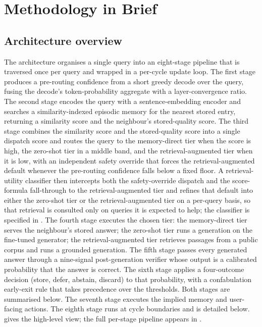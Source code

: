 \section{Methodology in Brief}
\label{sec:methodology-brief}

\subsection{Architecture overview}
\label{sec:arch-overview}

The architecture organises a single query into an eight-stage pipeline that is traversed once per query and wrapped in a per-cycle update loop. The first stage produces a pre-routing confidence from a short greedy decode over the query, fusing the decode's token-probability aggregate with a layer-convergence ratio. The second stage encodes the query with a sentence-embedding encoder and searches a similarity-indexed episodic memory for the nearest stored entry, returning a similarity score and the neighbour's stored-quality score. The third stage combines the similarity score and the stored-quality score into a single dispatch score and routes the query to the memory-direct tier when the score is high, the zero-shot tier in a middle band, and the retrieval-augmented tier when it is low, with an independent safety override that forces the retrieval-augmented default whenever the pre-routing confidence falls below a fixed floor. A retrieval-utility classifier then intercepts both the safety-override dispatch and the score-formula fall-through to the retrieval-augmented tier and refines that default into either the zero-shot tier or the retrieval-augmented tier on a per-query basis, so that retrieval is consulted only on queries it is expected to help; the classifier is specified in . The fourth stage executes the chosen tier: the memory-direct tier serves the neighbour's stored answer; the zero-shot tier runs a generation on the fine-tuned generator; the retrieval-augmented tier retrieves passages from a public corpus and runs a grounded generation. The fifth stage passes every generated answer through a nine-signal post-generation verifier whose output is a calibrated probability that the answer is correct. The sixth stage applies a four-outcome decision (store, defer, abstain, discard) to that probability, with a confabulation early-exit rule that takes precedence over the thresholds. Both stages are summarised below. The seventh stage executes the implied memory and user-facing actions. The eighth stage runs at cycle boundaries and is detailed below.  gives the high-level view; the full per-stage pipeline appears in .

